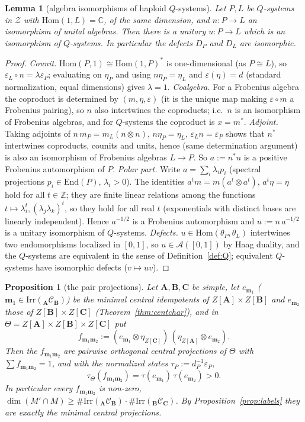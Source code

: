 \documentclass[11pt]{article}
\newtheorem{lemma}[theorem]{Lemma}
\newtheorem{proposition}[theorem]{Proposition}
\theoremstyle{definition}
\theoremstyle{remark}
\newcommand{\cA}{\mathcal A}
\newcommand{\bfB}{\mathbf B}
\newcommand{\bfA}{\mathbf A}
\newcommand{\bfC}{\mathbf C}
\begin{document}
\begin{lemma}[algebra isomorphisms of haploid $Q$-systems]\label{lem:Q5}
Let $P,L$ be $Q$-systems in $\mathcal Z$ with $\mathrm{Hom}(1,L)=\mathbb C$, of the same dimension, and $n\colon P\to L$ an isomorphism of unital algebras. Then there is a unitary $u\colon P\to L$ which is an isomorphism of $Q$-systems. In particular the defects $D_P$ and $D_L$ are isomorphic.
\end{lemma}
\begin{proof}
\emph{Counit.} $\mathrm{Hom}(P,1)\cong\mathrm{Hom}(1,P)^*$ is one-dimensional (as $P\cong L$), so $\varepsilon_L\circ n=\lambda\varepsilon_P$; evaluating on $\eta_P$ and using $n\eta_P=\eta_L$ and $\varepsilon(\eta)=d$ (standard normalization, equal dimensions) gives $\lambda=1$. \emph{Coalgebra.} For a Frobenius algebra the coproduct is determined by $(m,\eta,\varepsilon)$ (it is the unique map making $\varepsilon\circ m$ a Frobenius pairing), so $n$ also intertwines the coproducts; i.e.\ $n$ is an isomorphism of Frobenius algebras, and for $Q$-systems the coproduct is $x=m^*$. \emph{Adjoint.} Taking adjoints of $n\,m_P=m_L(n\otimes n)$, $n\eta_P=\eta_L$, $\varepsilon_Ln=\varepsilon_P$ shows that $n^*$ intertwines coproducts, counits and units, hence (same determination argument) is also an isomorphism of Frobenius algebras $L\to P$. So $a:=n^*n$ is a positive Frobenius automorphism of $P$. \emph{Polar part.} Write $a=\sum_i\lambda_ip_i$ (spectral projections $p_i\in\mathrm{End}(P)$, $\lambda_i>0$). The identities $a^tm=m(a^t\otimes a^t)$, $a^t\eta=\eta$ hold for all $t\in\mathbb Z$; they are finite linear relations among the functions $t\mapsto\lambda_i^t,(\lambda_j\lambda_k)^t$, so they hold for all real $t$ (exponentials with distinct bases are linearly independent). Hence $a^{-1/2}$ is a Frobenius automorphism and $u:=n\,a^{-1/2}$ is a unitary isomorphism of $Q$-systems. \emph{Defects.} $u\in\mathrm{Hom}(\theta_P,\theta_L)$ intertwines two endomorphisms localized in $[0,1]$, so $u\in\cA([0,1])$ by Haag duality, and the $Q$-systems are equivalent in the sense of Definition~\ref{def:Q}; equivalent $Q$-systems have isomorphic defects ($v\mapsto uv$).
\end{proof}
\begin{proposition}[the pair projections]\label{prop:pairproj}
Let $\bfA,\bfB,\bfC$ be simple, let $e_{\mathbf m_1}$ ($\mathbf m_1\in\mathrm{Irr}({}_{\bfA}\mathcal C_{\bfB})$) be the minimal central idempotents of $Z[\bfA]\times Z[\bfB]$ and $e_{\mathbf m_2}$ those of $Z[\bfB]\times Z[\bfC]$ (Theorem~\ref{thm:centchar}), and in $\Theta=Z[\bfA]\times Z[\bfB]\times Z[\bfC]$ put
\[
f_{\mathbf m_1\mathbf m_2}:=(e_{\mathbf m_1}\otimes\eta_{Z[\bfC]})\,(\eta_{Z[\bfA]}\otimes e_{\mathbf m_2}).
\]
Then the $f_{\mathbf m_1\mathbf m_2}$ are pairwise orthogonal central projections of $\Theta$ with $\sum f_{\mathbf m_1\mathbf m_2}=1$, and with the normalized states $\tau_P:=d_P^{-1}\varepsilon_P$,
\[
\tau_\Theta(f_{\mathbf m_1\mathbf m_2})=\tau(e_{\mathbf m_1})\,\tau(e_{\mathbf m_2})>0 .
\]
In particular every $f_{\mathbf m_1\mathbf m_2}$ is non-zero, $\dim(M'\cap M)\ge\#\mathrm{Irr}({}_{\bfA}\mathcal C_{\bfB})\cdot\#\mathrm{Irr}({}_{\bfB}\mathcal C_{\bfC})$. By Proposition~\ref{prop:labels} they are exactly the minimal central projections.
\end{proposition}
\end{document}
